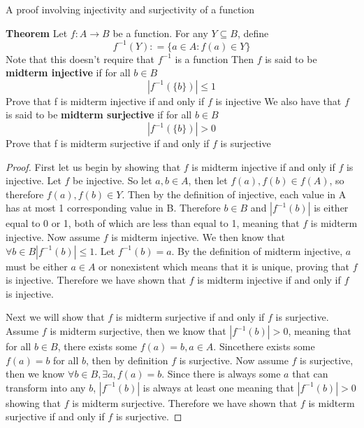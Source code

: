 A proof involving injectivity and surjectivity of a function

\textbf{Theorem}
Let $f: A\rightarrow B$ be a function. For any $Y \subseteq B$, define
$$ f^{-1}(Y): = \{a \in A: f(a) \in Y\} $$
Note that this doesn't require that $f^{-1}$ is a function
Then $f$ is said to be \textbf{midterm injective} if for all $b \in B$
$$|f^{-1} (\{b\})| \leq 1 $$
Prove that f is midterm injective if and only if $f$ is injective
We also have that $f$ is said to be \textbf{midterm surjective} if for all $b \in B$
$$| f^{-1}(\{b\})| > 0 $$
Prove that f is midterm surjective if and only if $f$ is surjective

\begin{proof}
First let us begin by showing that $f$ is midterm injective if and only if $f$ is injective.
Let $f$ be injective. So let $a,b \in A$, then let $f(a),f(b) \in f(A)$, so therefore $f(a),f(b) \in Y$. Then by the definition of injective, each value in A has at most 1 corresponding value in B. Therefore $b\in B$ and $|f^{-1} (b)|$ is either equal to 0 or 1, both of which are less than equal to 1, meaning that $f$ is midterm injective.
Now assume $f$ is midterm injective. We then know that $\forall b \in B  |f^{-1} (b)| \leq 1$. Let $f^{-1} (b) = a$. By the definition of midterm injective, $a$ must be either $a \in A$ or nonexistent which means that it is unique, proving that $f$ is injective. Therefore we have shown that $f$ is midterm injective if and only if $f$ is injective.

Next we will show that $f$ is midterm surjective if and only if $f$ is surjective. Assume $f$ is midterm surjective, then we know that $|f^{-1} (b)|  > 0$, meaning that for all $b \in B$, there exists some $f(a) = b, a \in A$. Sincethere exists some $f(a) = b$ for all $b$, then by definition $f$ is surjective.
Now assume $f$ is surjective, then we know $\forall b \in B, \exists a , f(a) = b$. Since there is always some $a$ that can transform into any $b$, $|f^{-1} (b)|$ is always at least one meaning that $|f^{-1} (b)| > 0$ showing that $f$ is midterm surjective.
Therefore we have shown that $f$ is midterm surjective if and only if $f$ is surjective.
\end{proof}